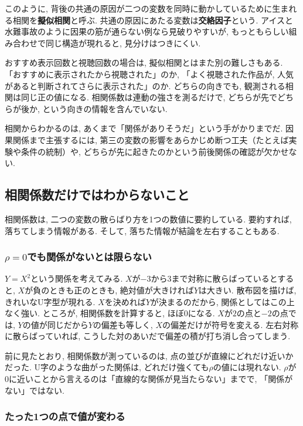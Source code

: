 このように, 背後の共通の原因が二つの変数を同時に動かしているために生まれる相関を\textbf{擬似相関}と呼ぶ.
共通の原因にあたる変数は\textbf{交絡因子}という.
アイスと水難事故のように因果の筋が通らない例なら見破りやすいが, もっともらしい組み合わせで同じ構造が現れると, 見分けはつきにくい.

おすすめ表示回数と視聴回数の場合は, 擬似相関とはまた別の難しさもある.
「おすすめに表示されたから視聴された」のか, 「よく視聴された作品が, 人気があると判断されてさらに表示された」のか.
どちらの向きでも, 観測される相関は同じ正の値になる.
相関係数は連動の強さを測るだけで, どちらが先でどちらが後か, という向きの情報を含んでいない.

相関からわかるのは, あくまで「関係がありそうだ」という手がかりまでだ.
因果関係まで主張するには, 第三の変数の影響をあらかじめ断つ工夫（たとえば実験や条件の統制）や, どちらが先に起きたのかという前後関係の確認が欠かせない.


\subsection{相関係数だけではわからないこと}

相関係数は, 二つの変数の散らばり方を1つの数値に要約している.
要約すれば, 落ちてしまう情報がある.
そして, 落ちた情報が結論を左右することもある.

\subsubsection*{\texorpdfstring{$\rho = 0$}{ρ = 0}でも関係がないとは限らない}

$Y = X^2$という関係を考えてみる.
$X$が$-3$から$3$まで対称に散らばっているとすると, $X$が負のときも正のときも, 絶対値が大きければ$Y$は大きい.
散布図を描けば, きれいなU字型が現れる.
$X$を決めれば$Y$が決まるのだから, 関係としてはこの上なく強い.
ところが, 相関係数を計算すると, ほぼ0になる.
$X$が$2$の点と$-2$の点では, $Y$の値が同じだから$Y$の偏差も等しく, $X$の偏差だけが符号を変える.
左右対称に散らばっていれば, こうした対のあいだで偏差の積が打ち消し合ってしまう.

前に見たとおり, 相関係数が測っているのは, 点の並びが直線にどれだけ近いかだった.
U字のような曲がった関係は, どれだけ強くても$\rho$の値には現れない.
$\rho$が0に近いことから言えるのは「直線的な関係が見当たらない」までで, 「関係がない」ではない.

\subsubsection*{たった1つの点で値が変わる}

